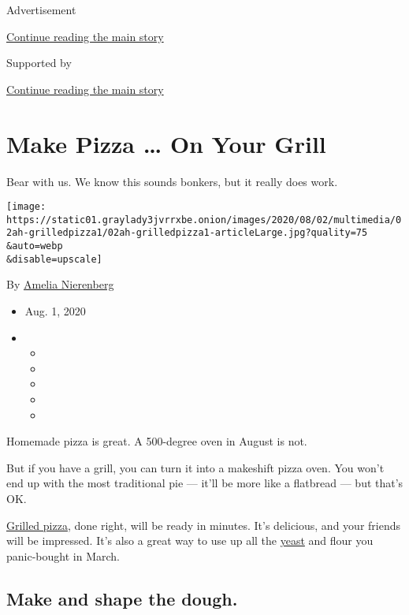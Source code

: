Advertisement

\protect\hyperlink{after-top}{Continue reading the main story}

Supported by

\protect\hyperlink{after-sponsor}{Continue reading the main story}

\hypertarget{make-pizza--on-your-grill}{%
\section{Make Pizza \ldots{} On Your
Grill}\label{make-pizza--on-your-grill}}

Bear with us. We know this sounds bonkers, but it really does work.

\texttt{[image: https://static01.graylady3jvrrxbe.onion/images/2020/08/02/multimedia/02ah-grilledpizza1/02ah-grilledpizza1-articleLarge.jpg?quality=75\\\&auto=webp\\\&disable=upscale]}

By \href{https://www.nytimes3xbfgragh.onion/by/amelia-nierenberg}{Amelia
Nierenberg}

\begin{itemize}
\item
  Aug. 1, 2020
\item
  \begin{itemize}
  \item
  \item
  \item
  \item
  \item
  \end{itemize}
\end{itemize}

Homemade pizza is great. A 500-degree oven in August is not.

But if you have a grill, you can turn it into a makeshift pizza oven.
You won't end up with the most traditional pie --- it'll be more like a
flatbread --- but that's OK.

\href{https://www.nytimes3xbfgragh.onion/2013/07/01/health/forgot-tofu-hot-dogs-pizza-on-the-grill.html}{Grilled
pizza}, done right, will be ready in minutes. It's delicious, and your
friends will be impressed. It's also a great way to use up all the
\href{https://slate.com/business/2020/04/yeast-shortage-supermarkets-coronavirus.html}{yeast}
and flour you panic-bought in March.

\hypertarget{make-and-shape-the-dough}{%
\subsection{Make and shape the dough.}\label{make-and-shape-the-dough}}

